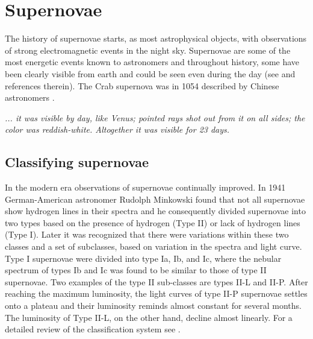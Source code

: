 

\chapter{Supernovae}
The history of supernovae starts, as most astrophysical objects, with observations of strong
electromagnetic events in the night sky. Supernovae are some of the most energetic events known to astronomers and throughout history, some have been clearly visible from earth and could be seen even during the day (see \cite{hamacher_14} and references therein). 
The Crab supernova was in 1054 described by Chinese astronomers \citep{ho_96,shen_96}. 
\begin{displayquote}
\textit{... it was visible by day, like Venus; pointed rays shot out
from it on all sides; the color was reddish-white. Altogether it
was visible for 23 days.}
\end{displayquote}
\section{Classifying supernovae}
In the modern era observations of supernovae continually improved. In 1941
German-American astronomer Rudolph Minkowski \citep{minkowski_41} found
that not all supernovae show hydrogen lines in their spectra and
he consequently divided supernovae into two types based on the
presence of hydrogen (Type II) or lack of hydrogen lines (Type I).
Later it was recognized that there were variations within these two classes
and a set of subclasses, based on variation in the spectra and light curve. 
Type I supernovae were divided into type Ia, Ib, and Ic,
where the nebular spectrum of types Ib and Ic was found to be similar to
those of type II supernovae. Two examples of the type II sub-classes are
types II-L and II-P. After reaching the maximum luminosity, the light curves of type II-P supernovae settles onto a
plateau and their luminosity reminds almost constant for several months. The luminosity of Type II-L, on the other hand, 
decline almost linearly. For a detailed review of the classification system see \cite{cappellaro_01}.

